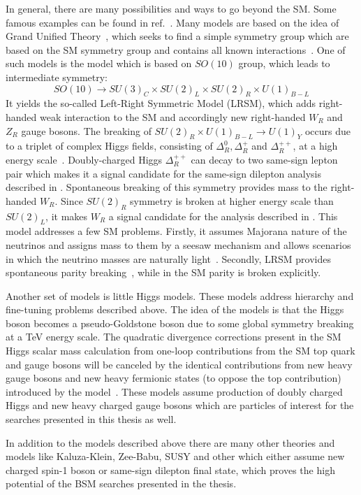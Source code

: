 In general, there are many possibilities and ways to go beyond the SM. 
Some famous examples can be found in ref.~\cite{Ellis:2011jb}.
Many models are based on the idea of Grand Unified Theory~\cite{GUT_bigPaper},
which seeks to find a simple symmetry group which are based on the SM symmetry group
and contains all known interactions~\cite{Langacker:1984dc,Cvetic:1995zs}.
One of such models is the model which is based on $SO(10)$ group, which leads to intermediate symmetry:
\begin{equation}
SO(10) \to SU(3)_C \times SU(2)_L \times SU(2)_R \times U(1)_{B-L}
\end{equation}
It yields the so-called Left-Right Symmetric Model (LRSM), which adds
right-handed weak interaction to the SM and accordingly new right-handed $W_R$ and $Z_R$ gauge bosons.
The breaking of $SU(2)_R \times U(1)_{B-L} \to U(1)_Y$ occurs due to a triplet of complex Higgs fields, consisting of $\Delta^0_R, \Delta^+_R$ and $\Delta^{++}_R$, at a high energy scale~\cite{Azuelos:2004mwa}.
Doubly-charged Higgs $\Delta^{++}_R$ can decay to two same-sign lepton pair which makes it a signal candidate for the same-sign dilepton analysis described in . Spontaneous breaking of this symmetry provides mass to the right-handed $W_R$.
Since $SU(2)_R$ symmetry is broken at higher energy scale than $SU(2)_L$, it makes
$W_R$ a signal candidate for the analysis described in .
This model addresses a few SM problems. Firstly, it assumes Majorana nature of the neutrinos and assigns mass to them by a seesaw mechanism and allows scenarios in which the neutrino masses are naturally light~\cite{Mohapatra:1979ia}. 
Secondly, LRSM provides spontaneous parity breaking~\cite{Grimus:1993fx}, while in the SM parity is broken explicitly.

Another set of models is little Higgs models.
These models address hierarchy and fine-tuning problems described above.
The idea of the models is that the Higgs boson becomes a pseudo-Goldstone boson due to some global symmetry breaking at a TeV energy scale.
The quadratic divergence corrections present in the SM Higgs scalar mass calculation from one-loop contributions from the SM top quark and gauge bosons will be canceled 
by the identical contributions from new heavy gauge bosons and new heavy fermionic states (to oppose the top contribution) introduced by the model~\cite{Han:2003wu,Brak}.
These models assume production of doubly charged Higgs and new heavy charged gauge bosons which are particles of interest for the searches presented in this thesis as well.

In addition to the models described above there are many other theories and models like Kaluza-Klein, Zee-Babu, SUSY and other which either assume new charged spin-1 boson or same-sign dilepton final state, which proves the high potential of the BSM searches presented in the thesis.